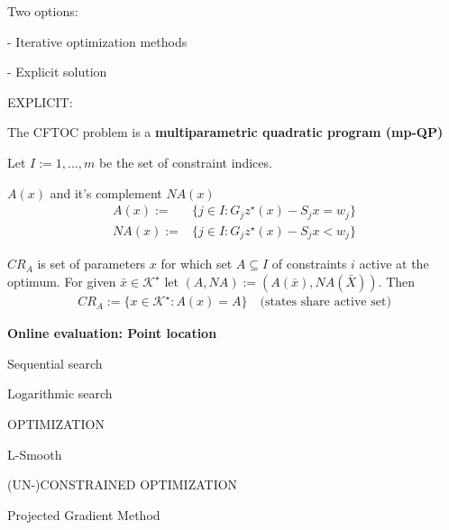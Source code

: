 Two options:

- Iterative optimization methods

- Explicit solution

EXPLICIT:

The CFTOC problem is a
\textbf{multiparametric quadratic program (mp-QP)}



Let $I := {1, . . . , m}$ be the set of constraint indices.
\begin{definition}
	$A(x)$ and it's complement $NA(x)$
	\begin{align*}
		A(x) :=  & \{j\in I: G_jz^\star(x) - S_jx = w_j \} \\
		NA(x) := & \{j\in I: G_jz^\star(x) - S_jx < w_j \}
	\end{align*}
\end{definition}

\begin{definition}
	$CR_A$ is set of parameters $x$ for which set $A\subseteq I$ of constraints $i$ active at the optimum.
	For given $\bar{x} \in \mathcal{K}^\star$ let $(A,NA) := (A(\bar{x}), NA(\bar{X}))$. Then
	\begin{align*}
		CR_A := \{x\in\mathcal{K}^\star : A(x) = A\} \quad \text{(states share active set)}
	\end{align*}
\end{definition}

\textbf{Online evaluation: Point location}

Sequential search

Logarithmic search

OPTIMIZATION


L-Smooth

(UN-)CONSTRAINED OPTIMIZATION

Projected Gradient Method %
